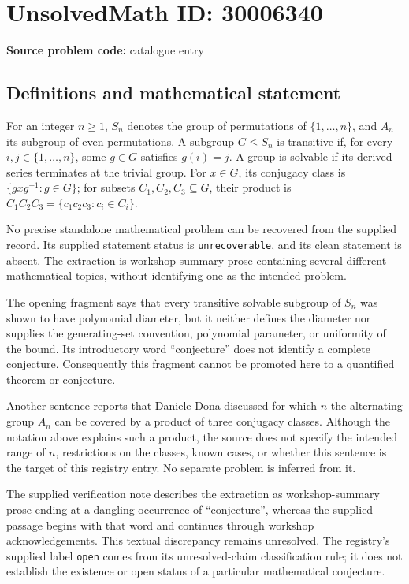 \documentclass[11pt]{article}
\begin{document}
\section*{UnsolvedMath ID: 30006340}
\textbf{Source problem code:} catalogue entry
\subsection{Definitions and mathematical statement}
For an integer \(n\geq 1\), \(S_n\) denotes the group of permutations of \(\{1,\ldots,n\}\), and \(A_n\) its subgroup of even permutations. A subgroup \(G\leq S_n\) is transitive if, for every \(i,j\in\{1,\ldots,n\}\), some \(g\in G\) satisfies \(g(i)=j\). A group is solvable if its derived series terminates at the trivial group. For \(x\in G\), its conjugacy class is \(\{gxg^{-1}:g\in G\}\); for subsets \(C_1,C_2,C_3\subseteq G\), their product is \(C_1C_2C_3=\{c_1c_2c_3:c_i\in C_i\}\).

No precise standalone mathematical problem can be recovered from the supplied record. Its supplied statement status is \texttt{unrecoverable}, and its clean statement is absent. The extraction is workshop-summary prose containing several different mathematical topics, without identifying one as the intended problem.

The opening fragment says that every transitive solvable subgroup of \(S_n\) was shown to have polynomial diameter, but it neither defines the diameter nor supplies the generating-set convention, polynomial parameter, or uniformity of the bound. Its introductory word ``conjecture'' does not identify a complete conjecture. Consequently this fragment cannot be promoted here to a quantified theorem or conjecture.

Another sentence reports that Daniele Dona discussed for which \(n\) the alternating group \(A_n\) can be covered by a product of three conjugacy classes. Although the notation above explains such a product, the source does not specify the intended range of \(n\), restrictions on the classes, known cases, or whether this sentence is the target of this registry entry. No separate problem is inferred from it.

The supplied verification note describes the extraction as workshop-summary prose ending at a dangling occurrence of ``conjecture'', whereas the supplied passage begins with that word and continues through workshop acknowledgements. This textual discrepancy remains unresolved. The registry's supplied label \texttt{open} comes from its unresolved-claim classification rule; it does not establish the existence or open status of a particular mathematical conjecture.
\end{document}
